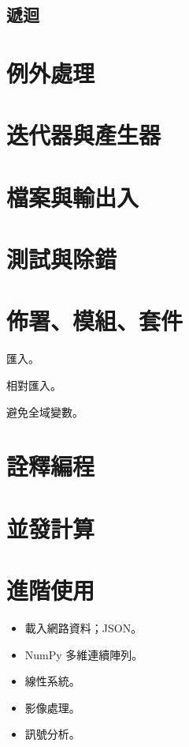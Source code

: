 \documentclass[a4paper,12pt]{book}
\theoremstyle{definition}
\begin{document}
\section{遞迴}

\chapter{例外處理}

\chapter{迭代器與產生器}

\chapter{檔案與輸出入}

\chapter{測試與除錯}

\chapter{佈署、模組、套件}

匯入。

相對匯入。

避免全域變數。

\chapter{詮釋編程}

\chapter{並發計算}

\chapter{進階使用}

\begin{itemize}

\item 載入網路資料；JSON。

\item NumPy 多維連續陣列。

\item 線性系統。

\item 影像處理。

\item 訊號分析。

\end{itemize}

\backmatter



\end{document}

